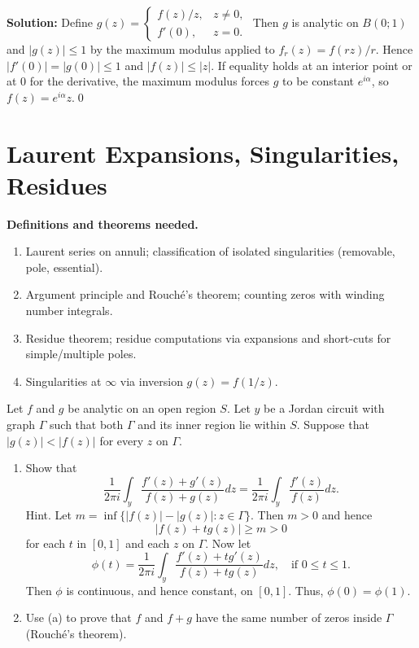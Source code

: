 \noindent\textbf{Solution:}
Define $g(z)=\begin{cases} f(z)/z,& z\ne0,\\ f'(0),& z=0.\end{cases}$ Then $g$ is analytic on $B(0;1)$ and $|g(z)|\le1$ by the maximum modulus applied to $f_r(z)=f(rz)/r$. Hence $|f'(0)|=|g(0)|\le1$ and $|f(z)|\le |z|$. If equality holds at an interior point or at $0$ for the derivative, the maximum modulus forces $g$ to be constant $e^{i\alpha}$, so $f(z)=e^{i\alpha}z$.\qed
\section{Laurent Expansions, Singularities, Residues}

\noindent\textbf{Definitions and theorems needed.}
\begin{enumerate}[label=(\alph*)]
\item Laurent series on annuli; classification of isolated singularities (removable, pole, essential).
\item Argument principle and Rouché's theorem; counting zeros with winding number integrals.
\item Residue theorem; residue computations via expansions and short-cuts for simple/multiple poles.
\item Singularities at $\infty$ via inversion $g(z)=f(1/z)$.
\end{enumerate}



\begin{problembox}
Let \( f \) and \( g \) be analytic on an open region \( S \). Let \( y \) be a Jordan circuit with graph \( \Gamma \) such that both \( \Gamma \) and its inner region lie within \( S \). Suppose that \( |g(z)| < |f(z)| \) for every \( z \) on \( \Gamma \).
\begin{enumerate}[label=(\alph*)]
\item Show that
\[ \frac{1}{2\pi i} \int_{y} \frac{f'(z) + g'(z)}{f(z) + g(z)} dz = \frac{1}{2\pi i} \int_{y} \frac{f'(z)}{f(z)} dz. \]
Hint. Let \( m = \inf \{ |f(z)| - |g(z)| : z \in \Gamma \} \). Then \( m > 0 \) and hence
\[ |f(z) + t g(z)| \geq m > 0 \]
for each \( t \) in \( [0, 1] \) and each \( z \) on \( \Gamma \). Now let
\[ \phi(t) = \frac{1}{2\pi i} \int_{y} \frac{f'(z) + t g'(z)}{f(z) + t g(z)} dz, \quad \text{if } 0 \leq t \leq 1. \]
Then \( \phi \) is continuous, and hence constant, on \( [0, 1] \). Thus, \( \phi(0) = \phi(1) \).
\item Use (a) to prove that \( f \) and \( f + g \) have the same number of zeros inside \(\Gamma\) (Rouché's theorem).
\end{enumerate}
\end{problembox}

